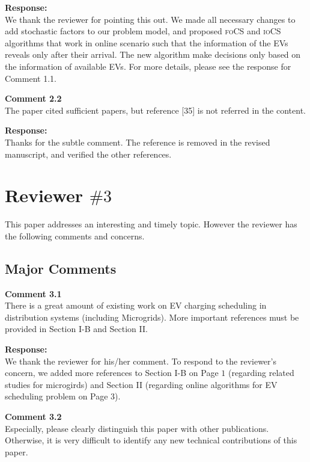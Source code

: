 \documentclass[11pt]{article}
\newcommand{\focs}{\textsc{foCS}\xspace}
\newcommand{\iocs}{\textsc{ioCS}\xspace}
\begin{document}
\vspace{7mm}
\noindent\textbf{Response:}\\
We thank the reviewer for pointing this out. We made all necessary changes to add stochastic factors to our problem model, and proposed \focs and \iocs algorithms that work in online scenario such that the information of the EVs reveals only after their arrival. The new algorithm make decisions only based on the information of available EVs. For more details, please see the response for Comment 1.1. 

\vspace{5mm}
{\color{blue}
\noindent\textbf{Comment 2.2}\\
The paper cited sufficient papers, but reference [35] is not referred in the content.
}

\vspace{7mm}
\noindent\textbf{Response:}\\
Thanks for the subtle comment. The reference is removed in the revised manuscript, and verified the other references. 
\newpage
\section{Reviewer $\# 3$}
{\color{blue}This paper addresses an interesting and timely topic. However the reviewer has the following comments and concerns.}

\subsection{Major Comments}

\vspace{5mm}
{\color{blue}
\noindent\textbf{Comment 3.1}\\
There is a great amount of existing work on EV charging scheduling in distribution systems (including Microgrids). More important references must be provided in Section I-B and Section II.}

\vspace{7mm}
\noindent\textbf{Response:}\\
We thank the reviewer for his/her comment. To respond to the reviewer's concern, we added more references to Section I-B on Page $1$ (regarding related studies for microgirds) and Section II (regarding online algorithms for EV scheduling problem on Page $3$).

\vspace{5mm}
{\color{blue}
\noindent\textbf{Comment 3.2}\\
Especially, please clearly distinguish this paper with other publications. Otherwise, it is very difficult to identify any new technical contributions of this paper.}
\end{document}
